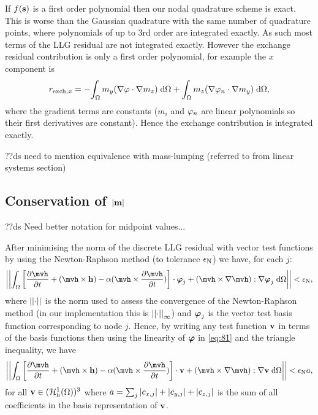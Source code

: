 {If $f({\boldsymbol{\mathrm{s}}})$ is a first order polynomial then our nodal quadrature scheme is exact.
This is worse than the Gaussian quadrature with the same number of quadrature points, where polynomials of up to 3rd order are integrated exactly.
As such most terms of the LLG residual are not integrated exactly.
However the exchange residual contribution is only a first order polynomial, for example the $x$ component is
\begin{equation}
  \begin{aligned}
    r_{\text{exch},x} = - {\int_{\Omega} { m_y {\left( \nabla \varphi \cdot \nabla m_z \right)}} {\; \mathrm{{d}}} {\Omega}} + {\int_{\Omega} { m_z {\left( \nabla \varphi_n \cdot \nabla m_y \right)}} {\; \mathrm{{d}}} {\Omega}},
  \end{aligned}
\end{equation}
where the gradient terms are constants ($m_i$ and $\varphi_n$ are linear polynomials so their first derivatives are constant).
Hence the exchange contribution is integrated exactly.


??ds need to mention equivalence with mass-lumping (referred to from linear systems section)

\subsection{Conservation of $\left|{\boldsymbol{\mathrm{m}}} \right|$}
\label{sec:weak-cons-absmv}

??ds Need better notation for midpoint values...

After minimising the norm of the discrete LLG residual with vector test functions by using the Newton-Raphson method (to tolerance $\epsilon_{\mathrm{N}}$) we have, for each $j$:
\begin{equation}
  \norm{\intd{ \bigs{\dmdth  + (\mvh \times \hv) - \dampc (\mvh \times \dmdth)} \cdot \tbfv_j + \bigb{\mvh \times \grad \mvh} : \grad \tbfv_j}} < \ntol,
  \label{eq:81}
\end{equation}
where $\left| \left| \cdot \right| \right|$ is the norm used to assess the convergence of the Newton-Raphson method (in our implementation this is $\left| \left| \cdot \right| \right|_\infty$) and $\boldsymbol{\mathrm{\varphi}}_j$ is the vector test basis function corresponding to node $j$.
Hence, by writing any test function $\boldsymbol{\mathrm{v}}$ in terms of the basis functions then using the linearity of $\boldsymbol{\mathrm{\varphi}}$ in \cref{eq:81} and the triangle inequality, we have
\begin{equation}
  \norm{\intd{ \bigs{\dmdth  + (\mvh \times \hv) - \dampc (\mvh \times \dmdth)} \cdot \testv + \bigb{\mvh \times \grad \mvh} : \grad \testv}} < \ntol  \sumbasiscoeff,
  \label{eq:82}
\end{equation}
for all $\boldsymbol{\mathrm{v}} \in ({\mathcal{H}^1_h(\Omega)})^3$ where $a = \sum_j  \left|{c_{x,j}} \right| + \left|{c_{y,j}} \right| + \left|{c_{z,j}} \right|$ is the sum of all coefficients in the basis representation of $\boldsymbol{\mathrm{v}}$.

}
